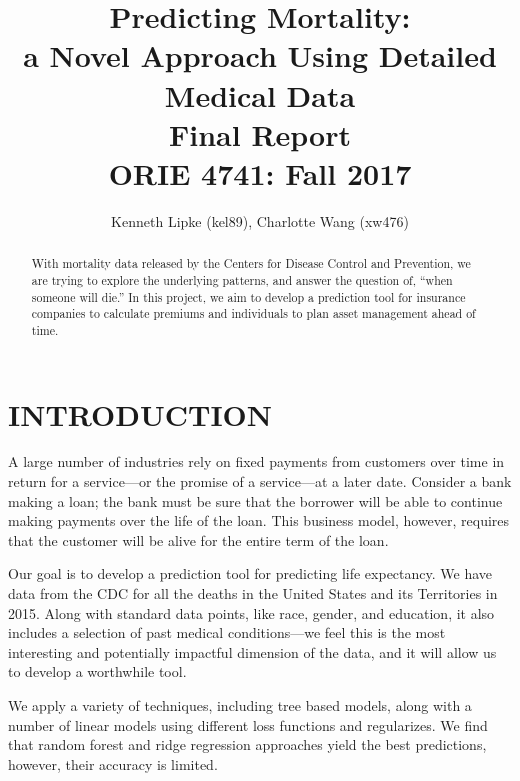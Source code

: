 \documentclass[letterpaper, 10 pt, conference]{ieeeconf}  %
\title{\LARGE {\bf
Predicting Mortality:} \\ {\Large a Novel Approach Using Detailed Medical Data}\\
{\large Final Report \\ ORIE 4741: Fall 2017}
}
\author{Kenneth Lipke (kel89), Charlotte Wang (xw476)}
\begin{document}
\setcounter{page}{1}

\maketitle
\thispagestyle{plain}
\pagestyle{plain}


\begin{abstract}

With mortality data released by the Centers for Disease Control and Prevention, we are trying to explore the underlying patterns, and answer the question of, ``when someone will die.'' In this project, we aim to develop a prediction tool for insurance companies to calculate premiums and individuals to plan asset management ahead of time.

\end{abstract}




\section{INTRODUCTION}

A large number of industries rely on fixed payments from customers over time in return for a service---or the promise of a service---at a later date. Consider a bank making a loan; the bank must be sure that the borrower will be able to continue making payments over the life of the loan. This business model, however, requires that the customer will be alive for the entire term of the loan.

Our goal is to develop a prediction tool for predicting life expectancy. We have data from the CDC for all the deaths in the United States and its Territories in 2015. Along with standard data points, like race, gender, and education, it also includes a selection of past medical conditions---we feel this is the most interesting and potentially impactful dimension of the data, and it will allow us to develop a worthwhile tool. 

We apply a variety of techniques, including tree based models, along with a number of linear models using different loss functions and regularizes. We find that random forest and ridge regression approaches yield the best predictions, however, their accuracy is limited. 
\end{document}
